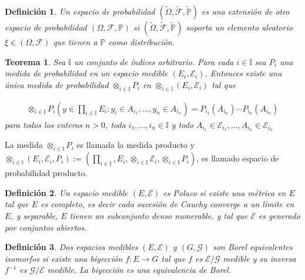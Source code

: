 \documentclass{article}
\newtheorem{Def}{Definición}
\newtheorem{Teo}{Teorema}
\newcommand{\prob}{\mathbb{P}}
\begin{document}
\begin{Def}
Un espacio de probabilidad $\left(\tilde{\Omega},\tilde{\mathcal{F}},\tilde{\prob}\right)$ es una extensi\'on de otro espacio de probabilidad $\left(\Omega,\mathcal{F},\prob\right)$ si $\left(\tilde{\Omega},\tilde{\mathcal{F}},\tilde{\prob}\right)$ soporta un elemento aleatorio $\xi\in\left(\Omega,\mathcal{F}\right)$ que tienen a $\prob$ como distribuci\'on.
\end{Def}

\begin{Teo}
Sea $\mathbb{I}$ un conjunto de \'indices arbitrario. Para cada $i\in\mathbb{I}$ sea $P_{i}$ una medida de probabilidad en un espacio medible $\left(E_{i},\mathcal{E}_{i}\right)$. Entonces existe una \'unica medida de probabilidad $\otimes_{i\in\mathbb{I}}P_{i}$ en $\otimes_{i\in\mathbb{I}}\left(E_{i},\mathcal{E}_{i}\right)$ tal que 

\begin{eqnarray*}
\otimes_{i\in\mathbb{I}}P_{i}\left(y\in\prod_{i\in\mathbb{I}}E_{i}:y_{i}\in A_{i_{1}},\ldots,y_{n}\in A_{i_{n}}\right)=P_{i_{1}}\left(A_{i_{n}}\right)\cdots P_{i_{n}}\left(A_{i_{n}}\right)
\end{eqnarray*}
para todos los enteros $n>0$, toda $i_{1},\ldots,i_{n}\in\mathbb{I}$ y todo $A_{i_{1}}\in\mathcal{E}_{i_{1}},\ldots,A_{i_{n}}\in\mathcal{E}_{i_{n}}$
\end{Teo}

La medida $\otimes_{i\in\mathbb{I}}P_{i}$ es llamada la medida producto y $\otimes_{i\in\mathbb{I}}\left(E_{i},\mathcal{E}_{i},P_{i}\right):=\left(\prod_{i\in\mathbb{I}},E_{i},\otimes_{i\in\mathbb{I}}\mathcal{E}_{i},\otimes_{i\in\mathbb{I}}P_{i}\right)$, es llamado espacio de probabilidad producto.


\begin{Def}
Un espacio medible $\left(E,\mathcal{E}\right)$ es \textit{Polaco} si existe una m\'etrica en $E$ tal que $E$ es completo, es decir cada sucesi\'on de Cauchy converge a un l\'imite en $E$, y \textit{separable}, $E$ tienen un subconjunto denso numerable, y tal que $\mathcal{E}$ es generado por conjuntos abiertos.
\end{Def}


\begin{Def}
Dos espacios medibles $\left(E,\mathcal{E}\right)$ y $\left(G,\mathcal{G}\right)$ son Borel equivalentes \textit{isomorfos} si existe una biyecci\'on $f:E\rightarrow G$ tal que $f$ es $\mathcal{E}/\mathcal{G}$ medible y su inversa $f^{-1}$ es $\mathcal{G}/\mathcal{E}$ medible. La biyecci\'on es una equivalencia de Borel.
\end{Def}
\end{document}
